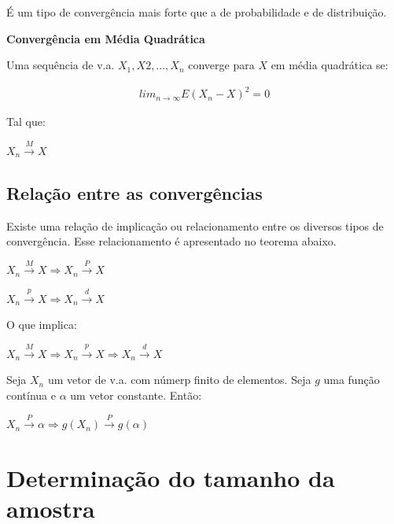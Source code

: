 \documentclass[
  letterpaper,
  DIV=11,
  numbers=noendperiod]{scrartcl}
\begin{document}
É um tipo de convergência mais forte que a de probabilidade e de
distribuição.

\begin{definicao}

\textbf{Convergência em Média Quadrática}

Uma sequência de v.a. \(X_1,X2,...,X_n\) converge para \(X\) em média
quadrática se:

\[\begin{array}{ccc}
lim_{n \rightarrow \infty} E(X_n - X)^{2} = 0
\end{array}\]

Tal que:

\(X_n \overset{M}{\rightarrow} X\)

\end{definicao}

\subsection{Relação entre as
convergências}\label{relauxe7uxe3o-entre-as-converguxeancias}

Existe uma relação de implicação ou relacionamento entre os diversos
tipos de convergência. Esse relacionamento é apresentado no teorema
abaixo.

\begin{teorema}

\(X_n \overset{M}{\rightarrow} X \Rightarrow X_n \overset{P}{\rightarrow} X\)

\(X_n \overset{p}{\rightarrow} X \Rightarrow X_n \overset{d}{\rightarrow} X\)

O que implica:

\(X_n \overset{M}{\rightarrow} X \Rightarrow X_n \overset{p}{\rightarrow} X \Rightarrow X_n \overset{d}{\rightarrow} X\)

\end{teorema}

\begin{teorema}

Seja \(X_n\) um vetor de v.a. com númerp finito de elementos. Seja \(g\)
uma função contínua e \(\alpha\) um vetor constante. Então:

\(X_n \overset{P}{\rightarrow} \alpha \Rightarrow g(X_n) \overset{P}{\rightarrow} g(\alpha)\)

\end{teorema}

\section{Determinação do tamanho da
amostra}\label{determinauxe7uxe3o-do-tamanho-da-amostra}
\end{document}
